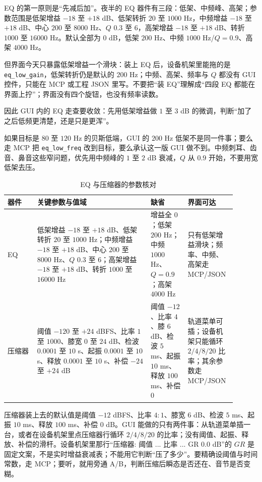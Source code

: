 EQ 的第一原则是“先减后加”。夜半的 EQ 器件有三段：低架、中频峰、高架；参数范围是低架增益 $-18$ 至 $+18$ dB、低架转折 $20$ 至 $1000$ Hz，中频增益 $-18$ 至 $+18$ dB、中心 $200$ 至 $8000$ Hz、$Q$ $0.3$ 至 $6$，高架增益 $-18$ 至 $+18$ dB、转折 $1000$ 至 $16000$ Hz。默认全部为 $0$ dB，低架 $200$ Hz、中频 $1000$ Hz/$Q=0.9$、高架 $4000$ Hz。

但界面今天只暴露低架增益一个滑块：装上 EQ 后，设备机架里能拖的是 \texttt{eq\_low\_gain}，低架转折仍是默认的 $200$ Hz；中频、高架、频率与 $Q$ 都没有 GUI 控件，只能在 MCP 或工程 JSON 里写。不要把“装 EQ”理解成“四段 EQ 都能在界面上拧”；界面没有四个旋钮，也没有频率读数。

因此 GUI 内的 EQ 走查要收敛：先用低架增益做 $1$ 至 $3$ dB 的微调，判断“加了之后低频更清楚，还是只是更浑”。


如果目标是 $80$ 至 $120$ Hz 的贝斯低端，GUI 的 $200$ Hz 低架不是同一件事；要么走 MCP 把 \texttt{eq\_low\_freq} 改到目标，要么承认这一版 GUI 做不到。中频刺耳、齿音、鼻音这些窄问题，优先用中频峰的 $1$ 至 $2$ dB 衰减，$Q$ 从 $0.9$ 开始，不要用宽低架去压。

\begin{table}[htbp]
\centering
\small
\begin{tabular}{@{}p{0.12\linewidth}p{0.46\linewidth}p{0.15\linewidth}p{0.17\linewidth}@{}}
\hline
器件 & 关键参数与值域 & 缺省 & 界面可达 \\
\hline
EQ & 低架增益 $-18$ 至 $+18$ dB、低架转折 $20$ 至 $1000$ Hz；中频增益 $-18$ 至 $+18$ dB、中心 $200$ 至 $8000$ Hz、$Q$ $0.3$ 至 $6$；高架增益 $-18$ 至 $+18$ dB、转折 $1000$ 至 $16000$ Hz & 增益全 $0$；低架 $200$ Hz；中频 $1000$ Hz、$Q=0.9$；高架 $4000$ Hz & 只有低架增益滑块；频率、中频、高架走 MCP/JSON \\
压缩器 & 阈值 $-120$ 至 $+24$ dBFS、比率 $1$ 至 $1000$、膝宽 $0$ 至 $24$ dB、检波 $0.0001$ 至 $10$ s、起振 $0.0001$ 至 $10$ s、释放 $0.0001$ 至 $10$ s、补偿 $-24$ 至 $+24$ dB & 阈值 $-12$、比率 $4$、膝 $6$ dB、检波 $5$ ms、起振 $10$ ms、释放 $100$ ms、补偿 $0$ & 轨道菜单可插；设备机架只能循环 $2/4/8/20$ 比率；其余参数走 MCP/JSON \\
\hline
\end{tabular}
\caption{EQ 与压缩器的参数核对}
\label{tab:walk-eq-comp}
\end{table}

压缩器装上去的默认值是阈值 $-12$ dBFS、比率 $4:1$、膝宽 $6$ dB、检波 $5$ ms、起振 $10$ ms、释放 $100$ ms、补偿 $0$ dB。GUI 能做的只有两件事：从轨道菜单插一台，或者在设备机架里点压缩器行循环 $2/4/8/20$ 的比率；没有阈值、起振、释放、补偿的滑杆。设备机架里那行“压缩器: 阈值 ... 比率 ... GR 0.0 dB”的 $GR$ 是固定文案，不是实时增益衰减表；不能用它判断“压了多少”。要精确设阈值与时间常数，走 MCP；要听，就用旁通 A/B，判断压缩后瞬态是否还在、音节是否变糊。

